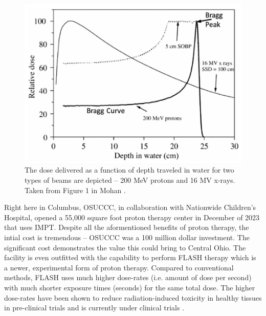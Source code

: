 \begin{figure}
	\centering
	\includegraphics[width=0.75\linewidth]{planning/images/bragg_curve.PNG}
	\caption{The dose delivered as a function of depth traveled in water for two types of beams are depicted -- 200 MeV protons and 16 MV x-rays. Taken from Figure 1 in Mohan \cite{Mohan_2022_PRO}.}
	\label{fig:bragg_curve}
\end{figure}
 
Right here in Columbus, \gls{OSUCCC}, in collaboration with Nationwide Children's Hospital, opened a 55,000 square foot proton therapy center in December of 2023 \cite{OSU_CCC} that uses \gls{IMPT}. Despite all the aformentioned benefits of proton therapy, the intial cost is tremendous -- \gls{OSUCCC} was a 100 million dollar investment. The significant cost demonstrates the value this could bring to Central Ohio. The facility is even outfitted with the capability to perform FLASH therapy which is a newer, experimental form of proton therapy. Compared to conventional methods, FLASH uses much higher dose-rates (i.e. amount of dose per second) with much shorter exposure times (seconds) for the same total dose. The higher dose-rates have been shown to reduce radiation-induced toxicity in healthy tissues in pre-clinical trials \cite{Matuszak_2022_Onc} and is currently under clinical trials \cite{OSU_CCC}. 

